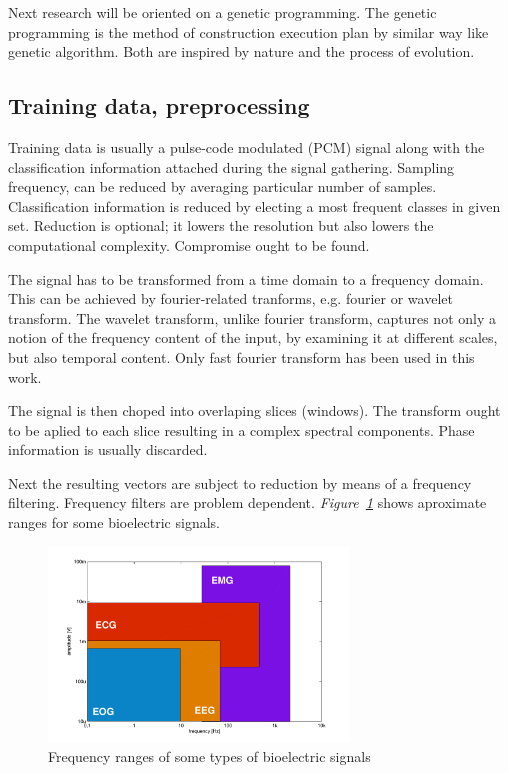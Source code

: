 \documentclass[a4paper,jurnal]{IEEEtran}
\begin{document}
Next research will be oriented on a genetic programming. The genetic programming 
is the method of construction execution plan by similar way like genetic
algorithm. Both are inspired by nature and the process of evolution.


\subsection{Training data, preprocessing}
Training data is usually a pulse-code modulated (PCM) signal \cite{pcm} along with the
classification information attached during the signal gathering.
Sampling frequency,
can be reduced by averaging particular number of samples. Classification
information is reduced by electing a most frequent classes in given set.
Reduction is optional; it lowers the resolution but also lowers the 
computational complexity. Compromise ought to be found.

The signal has to be transformed %
from a time domain to a frequency domain.
This can be achieved by fourier-related tranforms, e.g. fourier\cite{fourier} or
wavelet\cite{wavelet} transform.
The wavelet transform, unlike fourier transform, captures not only a notion of the 
frequency content of the input,
by examining it at different scales, but also temporal content.
Only fast fourier transform has been used in this work.

The signal is then choped into overlaping slices (windows).
The transform ought to be aplied to each slice resulting in
a complex spectral components.
Phase information is usually discarded.

Next the resulting vectors are subject to reduction by means of a
frequency filtering. Frequency filters are problem dependent.
\textit{Figure~\ref{fig:filters2}} shows aproximate ranges for some bioelectric signals.
\begin{figure}[h]
	\centering
	\includegraphics[width=80mm]{filters2}
	\caption{Frequency ranges of some types of bioelectric signals}
	\label{fig:filters2}
\end{figure}
\end{document}
